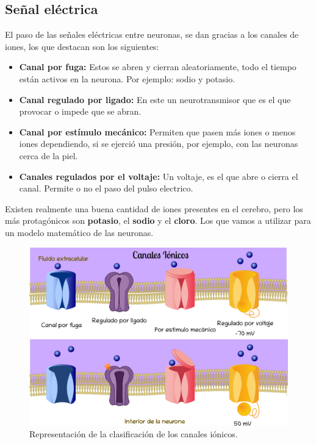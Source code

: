 







\subsection{Señal eléctrica}

El paso de las señales eléctricas entre neuronas, se dan gracias a los canales de iones, los que destacan son los siguientes:

\begin{itemize}
\item \textbf{Canal por fuga:} Estos se abren y cierran aleatoriamente, todo el tiempo están activos en la neurona. Por ejemplo: sodio y potasio.

\item \textbf{Canal regulado por ligado:} En este un neurotransmisor que es el que provocar o impede que se abran. 

\item  \textbf{Canal por estímulo mecánico:} Permiten que pasen más iones o menos iones dependiendo, si se ejerció una presión, por ejemplo, con las neuronas cerca de la piel.
\item \textbf{Canales regulados por el voltaje:} Un voltaje, es el que abre o cierra el canal. Permite o no el paso del pulso electrico. %
\end{itemize}


Existen realmente una buena cantidad de iones presentes en el cerebro, pero los más protagónicos son \textbf{potasio}, el \textbf{sodio} y el \textbf{cloro}. Los que vamos a utilizar para un modelo matemático de las neuronas. 


\begin{figure}[h]
 \centering
 \includegraphics[scale=0.28]{../Figuras/canalesIonicos.png}
 \caption{Representación de la clasificación de los canales iónicos.}
 \label{fig:MembranaP}
\end{figure}




